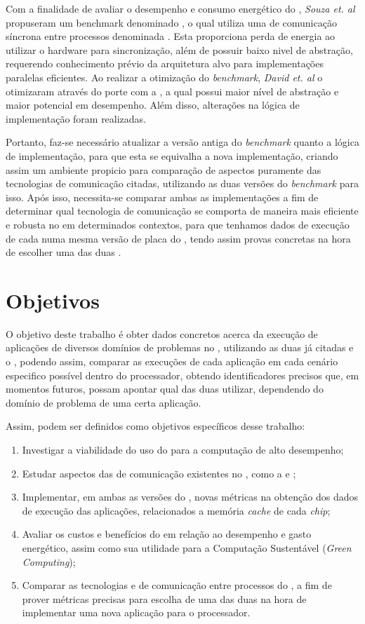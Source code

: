 \documentclass[
    12pt,               %
    openright,          %
    twoside,            %
    a4paper,            %
    english,            %
    brazil,             %
    ]{abntex2}
\begin{document}
Com a finalidade de avaliar o desempenho e consumo energético do \mppa, \textit{Souza et. al} propuseram um benchmark denominado \capb, o qual utiliza uma \api de comunicação síncrona entre processos denominada \ipc \cite{MPPA-2:2013}.
Esta \api proporciona perda de energia ao utilizar o hardware para sincronização, além de possuir baixo nivel de abstração, requerendo conhecimento prévio da arquitetura alvo para implementações paralelas eficientes. Ao realizar a otimização do \textit{benchmark}, \textit{David et. al} o otimizaram através do porte com a \api \async, a qual possui maior nível de abstração e maior potencial em desempenho. Além disso, alterações na lógica de implementação foram realizadas.

Portanto, faz-se necessário atualizar a versão antiga do \textit{benchmark} quanto a lógica de implementação, para que esta se equivalha a nova implementação, criando assim um ambiente propicio para comparação de aspectos puramente das tecnologias de comunicação citadas, utilizando as duas versões do \textit{benchmark} para isso. Após isso, necessita-se comparar ambas as implementações a fim de determinar qual tecnologia de comunicação se comporta de maneira mais eficiente e robusta no \mppa em determinados contextos, para que tenhamos dados de execução de cada \api numa mesma versão de placa do \mppa, tendo assim provas concretas na hora de escolher uma das duas \apis.

\chapter{Objetivos}
\label{cap:objetivos}

O objetivo deste trabalho é obter dados concretos acerca da execução de aplicações de diversos domínios de problemas no \mppa, utilizando as duas \apis já citadas e o \capb, podendo assim, comparar as execuções de cada aplicação em cada cenário especifico possível dentro do processador, obtendo identificadores precisos que, em momentos futuros, possam apontar qual das duas \apis utilizar, dependendo do domínio de problema de uma certa aplicação.

Assim, podem ser definidos como objetivos específicos desse trabalho:
\begin{enumerate}
    \item Investigar a viabilidade do uso do \mppa para a computação de alto desempenho;
    \item Estudar aspectos das \apis de comunicação existentes no \mppa, como a \async e \ipc;
    \item Implementar, em ambas as versões do \capb, novas métricas na obtenção dos dados de execução das aplicações, relacionados a memória \textit{cache} de cada \textit{chip};
    \item Avaliar os custos e benefícios do \mppa em relação ao desempenho e gasto energético, assim como sua utilidade para a Computação Sustentável (\textit{Green Computing});
    \item Comparar as tecnologias \async e \ipc de comunicação entre processos do \mppa, a fim de prover métricas precisas para escolha de uma das duas na hora de implementar uma nova aplicação para o processador.
\end{enumerate}
\end{document}

